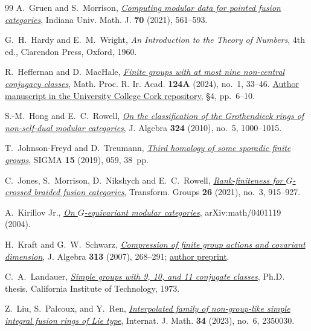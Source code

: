 \documentclass[11pt]{amsart}
\numberwithin{equation}{section}
\theoremstyle{definition}
\theoremstyle{plain}
\begin{document}
\begin{thebibliography}{99}
A.~Gruen and S.~Morrison,
\href{https://doi.org/10.1512/IUMJ.2021.70.8309}{\emph{Computing modular data for pointed fusion categories}},
Indiana Univ. Math. J. \textbf{70} (2021), 561--593.

G.~H.~Hardy and E.~M.~Wright, \emph{An Introduction to the Theory of Numbers},
4th ed., Clarendon Press, Oxford, 1960.

R.~Heffernan and D.~MacHale,
\href{https://doi.org/10.1353/mpr.2024.a931175}{\emph{Finite groups
with at most nine non-central conjugacy classes}},
Math. Proc. R. Ir. Acad. \textbf{124A} (2024), no.~1, 33--46.
\href{https://hdl.handle.net/10468/16879}{Author manuscript in the University College Cork repository}, \S4, pp.~6--10.

S.-M.~Hong and E.~C.~Rowell,
\href{https://doi.org/10.1016/j.jalgebra.2009.11.044}{\emph{On the classification of the Grothendieck rings of non-self-dual modular categories}},
J. Algebra \textbf{324} (2010), no.~5, 1000--1015.

T.~Johnson-Freyd and D.~Treumann,
\href{https://doi.org/10.3842/SIGMA.2019.059}{\emph{Third homology of
some sporadic finite groups}}, SIGMA \textbf{15} (2019), 059, 38~pp.

C.~Jones, S.~Morrison, D.~Nikshych and E.~C.~Rowell,
\href{https://doi.org/10.1007/s00031-020-09576-2}{\emph{Rank-finiteness for $G$-crossed braided fusion categories}},
Transform. Groups \textbf{26} (2021), no.~3, 915--927.

A.~Kirillov Jr.,
\href{https://arxiv.org/abs/math/0401119}{\emph{On $G$-equivariant modular categories}},
arXiv:math/0401119 (2004).

H.~Kraft and G.~W.~Schwarz,
\href{https://doi.org/10.1016/j.jalgebra.2006.12.025}{\emph{Compression of finite group actions and covariant dimension}},
J. Algebra \textbf{313} (2007), 268--291;
\href{https://arxiv.org/abs/math/0609253}{author preprint}.

C.~A.~Landauer,
\href{https://doi.org/10.7907/V2KC-3W98}{\emph{Simple groups with 9, 10, and 11 conjugate classes}},
Ph.D. thesis, California Institute of Technology, 1973.

Z.~Liu, S.~Palcoux, and Y.~Ren,
\href{https://doi.org/10.1142/S0129167X23500301}{\emph{Interpolated family of non-group-like simple integral fusion rings of Lie type}},
Internat. J. Math. \textbf{34} (2023), no.~6, 2350030.


\end{thebibliography}
\end{document}
